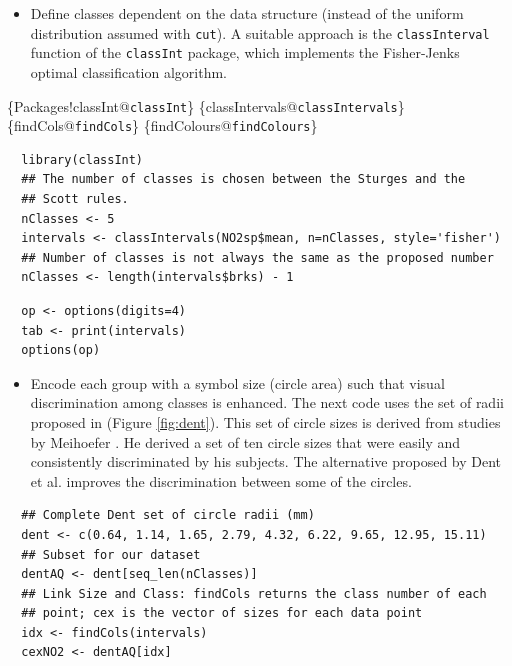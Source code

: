 \begin{itemize}
\item Define classes dependent on the data structure (instead of the
uniform distribution assumed with \texttt{cut}). A suitable approach is
the \texttt{classInterval} function of the \texttt{classInt} package, which
implements the Fisher-Jenks optimal classification
algorithm.
\end{itemize}

\begin{LaTeX}
\index\{Packages!classInt@\texttt{classInt}\}
\index\{classIntervals@\texttt{classIntervals}\}
\index\{findCols@\texttt{findCols}\}
\index\{findColours@\texttt{findColours}\}
\end{LaTeX}

\lstset{language=r,label= ,caption= ,captionpos=b,numbers=none}
\begin{lstlisting}
  library(classInt)
  ## The number of classes is chosen between the Sturges and the
  ## Scott rules.
  nClasses <- 5
  intervals <- classIntervals(NO2sp$mean, n=nClasses, style='fisher')
  ## Number of classes is not always the same as the proposed number
  nClasses <- length(intervals$brks) - 1
\end{lstlisting}

\lstset{language=r,label= ,caption= ,captionpos=b,numbers=none}
\begin{lstlisting}
  op <- options(digits=4)
  tab <- print(intervals)
  options(op)
\end{lstlisting}

\begin{itemize}
\item Encode each group with a symbol size (circle area) such that visual
discrimination among classes is enhanced. The next code uses the set
of radii proposed in \cite{Dent.Torguson.ea2008} (Figure
\ref{fig:dent}). This set of circle sizes is derived from studies by Meihoefer \cite{Meihoefer1969}. He derived a set of ten
circle sizes that were easily and consistently discriminated by his
subjects. The alternative proposed by Dent et al. improves the
discrimination between some of the circles.
\end{itemize}

\lstset{language=r,label= ,caption= ,captionpos=b,numbers=none}
\begin{lstlisting}
  ## Complete Dent set of circle radii (mm)
  dent <- c(0.64, 1.14, 1.65, 2.79, 4.32, 6.22, 9.65, 12.95, 15.11)
  ## Subset for our dataset
  dentAQ <- dent[seq_len(nClasses)]
  ## Link Size and Class: findCols returns the class number of each
  ## point; cex is the vector of sizes for each data point
  idx <- findCols(intervals)
  cexNO2 <- dentAQ[idx]
\end{lstlisting}

